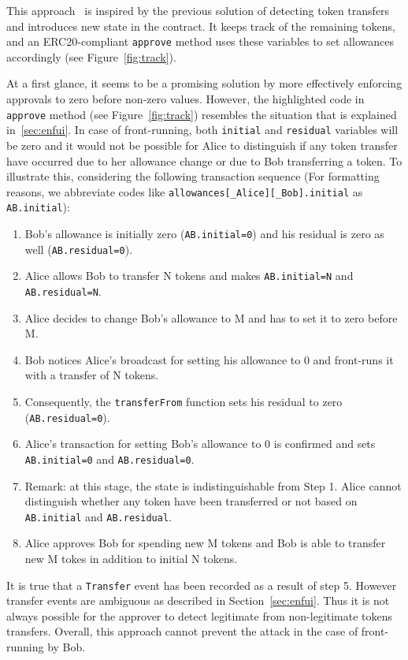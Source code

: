 This approach~\cite{Ref18} is inspired by the previous solution of detecting token transfers and introduces new state in the contract. It keeps track of the remaining tokens, and an ERC20-compliant \texttt{approve} method uses these variables to set allowances accordingly (see Figure~\ref{fig:track}).

At a first glance, it seems to be a promising solution by more effectively enforcing approvals to zero before non-zero values. However, the highlighted code in \texttt{approve} method (see Figure~\ref{fig:track}) resembles the situation that is explained in~\ref{sec:enfui}. In case of front-running, both \texttt{initial} and \texttt{residual} variables will be zero and it would not be possible for Alice to distinguish if any token transfer have occurred due to her allowance change or due to Bob transferring a token. To illustrate this, considering the following transaction sequence (For formatting reasons, we abbreviate codes like \texttt{allowances[\_Alice][\_Bob].initial} as \texttt{AB.initial}):

\begin{enumerate}
	\item Bob’s allowance is initially zero (\texttt{AB.initial=0}) and his residual is zero as well (\texttt{AB.residual=0}).
	\item Alice allows Bob to transfer N tokens and makes \texttt{AB.initial=N} and \texttt{AB.residual=N}.
	\item Alice decides to change Bob’s allowance to M and has to set it to zero before M.
	\item Bob notices Alice’s broadcast for setting his allowance to 0 and front-runs it with a transfer of N tokens.
	\item Consequently, the \texttt{transferFrom} function sets his residual to zero (\texttt{AB.residual=0}).
	\item Alice’s transaction for setting Bob's allowance to 0 is confirmed and sets \texttt{AB.initial=0} and \texttt{AB.residual=0}.
	\item Remark: at this stage, the state is indistinguishable from Step 1. Alice cannot distinguish whether any token have been transferred or not based on \texttt{AB.initial} and \texttt{AB.residual}. 
	\item Alice approves Bob for spending new M tokens and Bob is able to transfer new M tokes in addition to initial N tokens.
\end{enumerate}

It is true that a \texttt{Transfer} event has been recorded as a result of step 5. However transfer events are ambiguous as described in Section~\ref{sec:enfui}. Thus it is not always possible for the approver to detect legitimate from non-legitimate tokens transfers. Overall, this approach cannot prevent the attack in the case of front-running by Bob. 

